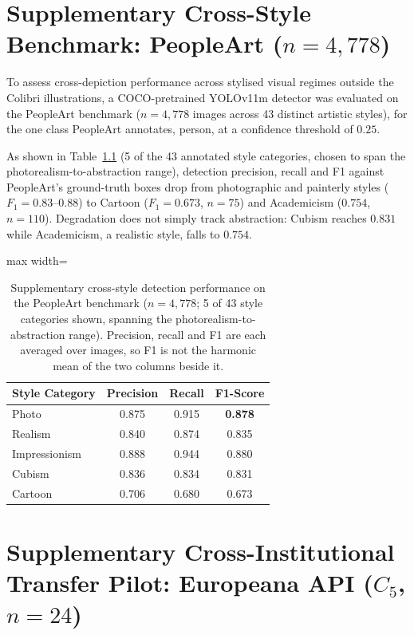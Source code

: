 \documentclass[12pt,a4paper]{report}
\begin{document}
\chapter{Supplementary Cross-Style Benchmark: PeopleArt (\texorpdfstring{$n=4{,}778$}{n = 4,778})}
\label{app:peopleart}
To assess cross-depiction performance across stylised visual regimes outside the Colibri illustrations, a COCO-pretrained YOLOv11m detector was evaluated on the PeopleArt benchmark \cite{westlake2016} ($n=4{,}778$ images across 43 distinct artistic styles), for the one class PeopleArt annotates, person, at a confidence threshold of $0.25$. 

As shown in Table~\ref{tab:peopleart_summary} (5 of the 43 annotated style categories, chosen to span the photorealism-to-abstraction range), detection precision, recall and F1 against PeopleArt's ground-truth boxes drop from photographic and painterly styles ($F_1 = 0.83$--$0.88$) to Cartoon ($F_1 = 0.673$, $n=75$) and Academicism ($0.754$, $n=110$). Degradation does not simply track abstraction: Cubism reaches $0.831$ while Academicism, a realistic style, falls to $0.754$.

\begin{table}[!htbp]
\centering
\caption[Person detection on PeopleArt, by style]{Supplementary cross-style detection performance on the PeopleArt benchmark ($n=4{,}778$; 5 of 43 style categories shown, spanning the photorealism-to-abstraction range). Precision, recall and F1 are each averaged over images, so F1 is not the harmonic mean of the two columns beside it.}
\label{tab:peopleart_summary}
\begin{adjustbox}{max width=\linewidth}
\begin{tabular}{lccc}
\toprule
\textbf{Style Category} & \textbf{Precision} & \textbf{Recall} & \textbf{F1-Score} \\
\midrule
Photo & 0.875 & 0.915 & \textbf{0.878} \\
Realism & 0.840 & 0.874 & 0.835 \\
Impressionism & 0.888 & 0.944 & 0.880 \\
Cubism & 0.836 & 0.834 & 0.831 \\
Cartoon & 0.706 & 0.680 & 0.673 \\
\bottomrule
\end{tabular}
\end{adjustbox}
\end{table}

\chapter[Cross-Institutional Transfer Pilot: Europeana (\texorpdfstring{$C_5$}{C5}, \texorpdfstring{$n=24$}{n = 24})]{Supplementary Cross-Institutional Transfer Pilot: Europeana API ($C_5$, $n=24$)}
\label{app:europeana}
\end{document}
